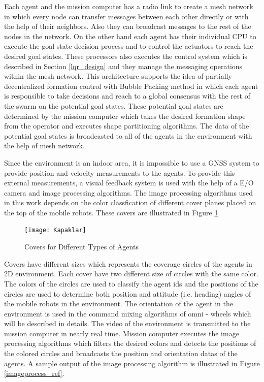 Each agent and the mission computer has a radio link to create a mesh network in which every node can transfer messages between each other directly or with the help of their neighbors. Also they can broadcast messages to the rest of the nodes in the network.  On the other hand each agent has their individual CPU to execute the goal state decision process and to control the actuators to reach the desired goal states. These processors also executes the control system which is described in Section \ref{lqr_design} and they manage the messaging operations within the mesh network.  This architecture supports the idea of partially decentralized formation control with Bubble Packing method in which each agent is responsible to take decisions and reach to a global consensus with the rest of the swarm on the potential goal states.  These potential goal states are determined by the mission computer which takes the desired formation shape from the operator and executes shape partitioning algorithms. The data of the potential goal states is broadcasted to all of the agents in the environment with the help of mesh network. 

Since the environment is an indoor area, it is impossible to use a GNSS system to provide position and velocity measurements to the agents. To provide this external measurements, a visual feedback system is used with the help of a E/O camera and image processing algorithms.  The image processing algorithms used in this work depends on the color classfication of different cover planes placed on the top of the mobile robots. These covers are illustrated in Figure \ref{kapaklar_ref}

\begin{figure}[H]
\caption{Covers for Different Types of Agents} \label{kapaklar_ref}
\centerline{\texttt{[image: Kapaklar]}}
\end{figure} 
		
Covers have different sizes which represents the coverage circles of the agents in 2D environment. Each cover have two different size of circles with the same color. The colors of the circles are used to classify the agent ids and the positions of the circles are used to determine both position and attitude (i.e. heading) angles of the mobile robots in the environment. The orientation of the agent in the environment is used in the command mixing algorithms of omni - wheels which will be described in details. The video of the environment is transmitted to the mission computer in nearly real time. Mission computer executes the image processing algorithms which filters the desired colors and detects the positions of the colored circles and broadcasts the position and orientation datas of the agents. A sample output of the image processing algorithm is illustrated in Figure \ref{imageprocess_ref}. 
		
